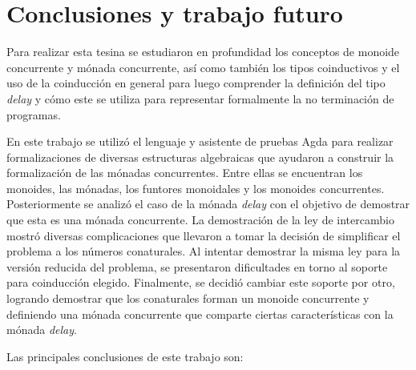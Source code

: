 \chapter{Conclusiones y trabajo futuro}

Para realizar esta tesina se estudiaron en profundidad los conceptos de monoide concurrente y mónada concurrente, así como también los tipos coinductivos y el uso de la coinducción en general para luego comprender la definición del tipo \textit{delay} y cómo este se utiliza para representar formalmente la no terminación de programas. 

En este trabajo se utilizó el lenguaje y asistente de pruebas Agda para realizar formalizaciones de diversas estructuras algebraicas que ayudaron a construir la formalización de las mónadas concurrentes. Entre ellas se encuentran los monoides, las mónadas, los funtores monoidales y los monoides concurrentes. Posteriormente se analizó el caso de la mónada \textit{delay} con el objetivo de demostrar que esta es una mónada concurrente. La demostración de la ley de intercambio mostró diversas complicaciones que llevaron a tomar la decisión de simplificar el problema a los números conaturales. Al intentar demostrar la misma ley para la versión reducida del problema, se presentaron dificultades en torno al soporte para coinducción elegido. Finalmente, se decidió cambiar este soporte por otro, logrando demostrar que los conaturales forman un monoide concurrente y definiendo una mónada concurrente que comparte ciertas características con la mónada \textit{delay}. 

Las principales conclusiones de este trabajo son: 

